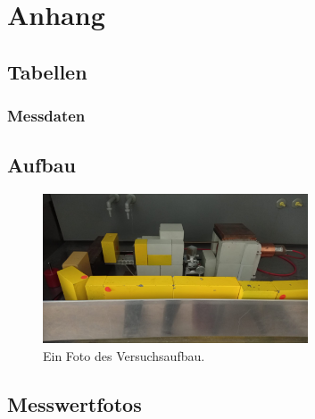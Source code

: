 \newpage
\section{Anhang}




\subsection{Tabellen}

\subsubsection{Messdaten}

%

\subsection{Aufbau}

\begin{figure}[h]
    \centering
    \includegraphics[width=0.7\textwidth]{latex/images/Aufbau_real.jpeg}
    \caption{Ein Foto des Versuchsaufbau.}
\end{figure}


\subsection{Messwertfotos}




